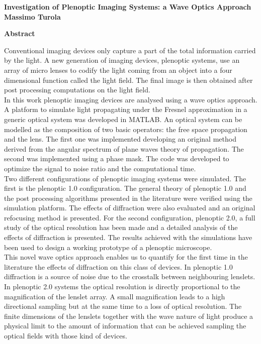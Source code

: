 \thispagestyle{plain}
\begin{center}
	\Large
	\textbf{Investigation of Plenoptic Imaging Systems: a Wave Optics Approach}
	\vspace{0.4cm}
	\\
	\large
	\textbf{Massimo Turola}
	
	\vspace{0.9cm}
	\textbf{Abstract}
\end{center}

Conventional imaging devices only capture a part of the total information carried by the light. A new generation of imaging devices, plenoptic systems, use an array of micro lenses to codify the light coming from an object into a four dimensional function called the light field. The final image is then obtained after post processing computations on the light field. \\
 In this work plenoptic imaging devices are analysed using a wave optics approach. A platform to simulate light propagating under the Fresnel approximation in a generic optical system was developed in MATLAB. An optical system can be modelled as the composition of two basic operators: the free space propagation and the lens. The first one was implemented developing an original method derived from the angular spectrum of plane waves theory of propagation. The second was implemented using a phase mask. The code was developed to optimize the signal to noise ratio and the computational time.
 \\
Two different configurations of plenoptic imaging systems were simulated. The first is the plenoptic 1.0 configuration. The general theory of plenoptic 1.0 and the post processing algorithms presented in the literature were verified using the simulation platform. The effects of diffraction were also evaluated and an original refocusing method is presented. For the second configuration, plenoptic 2.0, a full study of the optical resolution has been made and a detailed analysis of the effects of diffraction is presented. The results achieved with the simulations have been used to design a working prototype of a plenoptic microscope.
\\
 This novel wave optics approach enables us to quantify for the first time in the literature the effects of diffraction on this class of devices. In plenoptic 1.0 diffraction is a source of noise due to the crosstalk between neighbouring lenslets. In plenoptic 2.0 systems the optical resolution is directly proportional to the magnification of the lenslet array. A small magnification leads to a high directional sampling but at the same time to a loss of optical resolution. The finite dimensions of the lenslets together with the wave nature of light produce a physical limit to the amount of information that can be achieved sampling the optical fields with those kind of devices.